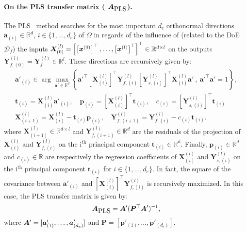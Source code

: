 {\paragraph{On the PLS transfer matrix ( $\bm{A}_{\mbox{PLS}}$).}
The PLS~\cite{hellandStructurePartialLeast1988} method searches for the most important $d_e$ orthonormal directions $\bm{a}_{(i)} \in \mathbb{R}^d$, $i \in \{1,\ldots,d_e\}$ of $\Omega$ in regards of the influence of (related to the DoE $\mathcal{D}_f$) the inputs \mbox{$\bm{X}^{(l)}_{(0)} = \left[\left[\bm{x}^{(0)}\right]^\top,\ldots,\left[\bm{x}^{(l)}\right]^\top \right]^\top \in \mathbb{R}^{d \times l}$} on the outputs $\bm{Y}^{(l)}_{f,(0)} = \bm{Y}^{(l)}_f \in \mathbb{R}^l$.
These directions are recursively given by: 
\begin{gather*}
	\bm{a}'_{(i)} \in \arg \max_{\bm{a}' \in \mathbb{R}^d} \left\{ \bm{a}'^\top \left[\bm{X}^{(l)}_{(i)}\right]^\top \bm{Y}^{(l)}_{f,(i)} \left[\bm{Y}^{(l)}_{s,(i)}\right]^\top \bm{X}^{(l)}_{(i)} \bm{a}' \ , \ \bm{a}'^\top \bm{a}' = 1 \right\}, \label{eq:kpls_opt}\\
	\bm{t}_{(i)} = \bm{X}^{(l)}_{(i)} \bm{a}'_{(i)}, \quad
	\bm{p}_{(i)} = \left[\bm{X}^{(l)}_{(i)}\right]^\top \bm{t}_{(i)} , \quad c_{(i)} = \left[\bm{Y}^{(l)}_{s,(i)}\right]^\top \bm{t}_{(i)} \\ \bm{X}^{(l)}_{(i+1)} = \bm{X}^{(l)}_{(i)} - \bm{t}_{(i)} \bm{p}_{(i)}, \quad
	\bm{Y}^{(l)}_{f,(i+1)} = \bm{Y}^{(l)}_{f,(i)} - c_{(i)} \bm{t}_{(i)}.
\end{gather*}
where $\bm{X}^{(l)}_{(i+1)} \in \mathbb{R}^{d \times l}$ and $\bm{Y}^{(l)}_{f,(i+1)} \in \mathbb{R}^d$ are the residuals of the projection of $\bm{X}^{(l)}_{(i)}$ and $\bm{Y}^{(l)}_{f,(i)}$ on the $\text{i}^{\text{th}}$ principal component $\bm{t}_{(i)} \in \mathbb{R}^d$.
Finally, $\bm{p}_{(i)} \in \mathbb{R}^d$ and $c_{(i)} \in \mathbb{R}$ are respectively the regression coefficients of $\bm{X}^{(l)}_{(i)}$ and $\bm{Y}^{(l)}_{s,(i)}$ on the $\text{i}^{\text{th}}$ principal component $\bm{t}_{(i)}$ for $i \in \{1,\ldots,d_e\}$.
In fact, the square of the covariance between $\bm{a}'_{(i)}$ and $\left[\bm{X}^{(l)}_{(i)}\right]^\top \bm{Y}^{(l)}_{f,(i)}$ is recursively maximized. In this case, the PLS transfer matrix is given by:
$$
\bm{A}_{\mbox{PLS}} = \bm{A}' (\bm{P}^\top \bm{A}')^{-1},
$$
where $\bm{A}' = [\bm{a}'_{(1)},\ldots,\bm{a}'_{(d_e)}] $ and $
	\bm{P} = [\bm{p}'_{(1)},\ldots,\bm{p}'_{(d_e)}]$. 


}
